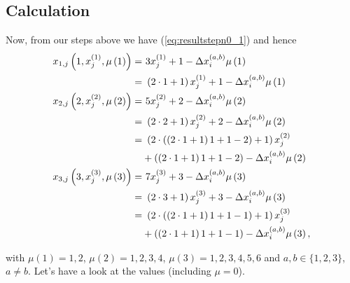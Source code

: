 \subsection{Calculation}
\label{ss:calcualtionstepn0_2}
Now, from our steps above we have (\ref{eq:resultstepn0_1}) and hence 
\begin{alignat}{3}
	x_{1,j}\left(1,x_{j}^{\left(1\right)},\mu\left(1\right)\right) =& \ 3x_{j}^{\left(1\right)} + 1 - \Delta x_{i}^{\left(a,b\right)}\mu\left(1\right) \notag \\ 
	=& \ \left(2 \cdot 1 + 1\right)x_{j}^{\left(1\right)} + 1 - \Delta x_{i}^{\left(a,b\right)}\mu\left(1\right) \label{eq:stepn0_2_eq3} \\
	x_{2,j}\left(2,x_{j}^{\left(2\right)},\mu\left(2\right)\right) =& \ 5x_{j}^{\left(2\right)} + 2 - \Delta x_{i}^{\left(a,b\right)}\mu\left(2\right) \notag \\
	=& \ \left(2 \cdot 2 + 1\right)x_{j}^{\left(2\right)} + 2 - \Delta x_{i}^{\left(a,b\right)}\mu\left(2\right) \notag \\
	=& \ \left(2 \cdot \left(\left(2 \cdot 1 + 1\right)1 + 1 - 2\right) + 1\right)x_{j}^{\left(2\right)} \notag \\
	&+ \left(\left(2 \cdot 1 + 1\right)1 + 1 - 2\right) - \Delta x_{i}^{\left(a,b\right)}\mu\left(2\right) \label{eq:stepn0_2_eq5} \\
	x_{3,j}\left(3,x_{j}^{\left(3\right)},\mu\left(3\right)\right) =& \ 7x_{j}^{\left(3\right)} + 3 - \Delta x_{i}^{\left(a,b\right)}\mu\left(3\right) \notag \\
	=& \ \left(2 \cdot 3 + 1\right)x_{j}^{\left(3\right)} + 3 - \Delta x_{i}^{\left(a,b\right)}\mu\left(3\right) \notag \\
	=& \ \left(2 \cdot \left(\left(2 \cdot 1 + 1\right)1 + 1 - 1\right) + 1\right)x_{j}^{\left(3\right)} \notag \\
	&+ \left(\left(2 \cdot 1 + 1\right)1 + 1 - 1\right) - \Delta x_{i}^{\left(a,b\right)}\mu\left(3\right), \label{eq:stepn0_2_eq7}
\end{alignat} 

with $\mu\left(1\right) = 1,2$, $\mu\left(2\right) = 1,2,3,4$, $\mu\left(3\right) = 1,2,3,4,5,6$ and $a,b \in \{1,2,3\}$, $a\neq b$. Let's have a look at the values (including $\mu = 0$).

